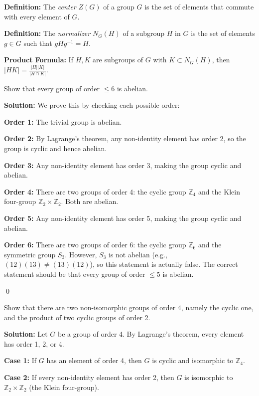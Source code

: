 \textbf{Definition:} The \textit{center} $Z(G)$ of a group $G$ is the set of elements that commute with every element of $G$.

\textbf{Definition:} The \textit{normalizer} $N_G(H)$ of a subgroup $H$ in $G$ is the set of elements $g \in G$ such that $gHg^{-1} = H$.

\textbf{Product Formula:} If $H, K$ are subgroups of $G$ with $K \subset N_G(H)$, then $|HK| = \frac{|H||K|}{|H \cap K|}$.

\begin{problembox}
Show that every group of order $\leq 6$ is abelian.
\end{problembox}

\noindent\textbf{Solution:} We prove this by checking each possible order:

\textbf{Order 1:} The trivial group is abelian.

\textbf{Order 2:} By Lagrange's theorem, any non-identity element has order 2, so the group is cyclic and hence abelian.

\textbf{Order 3:} Any non-identity element has order 3, making the group cyclic and abelian.

\textbf{Order 4:} There are two groups of order 4: the cyclic group $\mathbb{Z}_4$ and the Klein four-group $\mathbb{Z}_2 \times \mathbb{Z}_2$. Both are abelian.

\textbf{Order 5:} Any non-identity element has order 5, making the group cyclic and abelian.

\textbf{Order 6:} There are two groups of order 6: the cyclic group $\mathbb{Z}_6$ and the symmetric group $S_3$. However, $S_3$ is not abelian (e.g., $(12)(13) \neq (13)(12)$), so this statement is actually false. The correct statement should be that every group of order $\leq 5$ is abelian.


\qed
\begin{problembox}
Show that there are two non-isomorphic groups of order 4, namely the cyclic one, and the product of two cyclic groups of order 2.
\end{problembox}

\noindent\textbf{Solution:} Let $G$ be a group of order 4. By Lagrange's theorem, every element has order 1, 2, or 4.

\textbf{Case 1:} If $G$ has an element of order 4, then $G$ is cyclic and isomorphic to $\mathbb{Z}_4$.

\textbf{Case 2:} If every non-identity element has order 2, then $G$ is isomorphic to $\mathbb{Z}_2 \times \mathbb{Z}_2$ (the Klein four-group).

